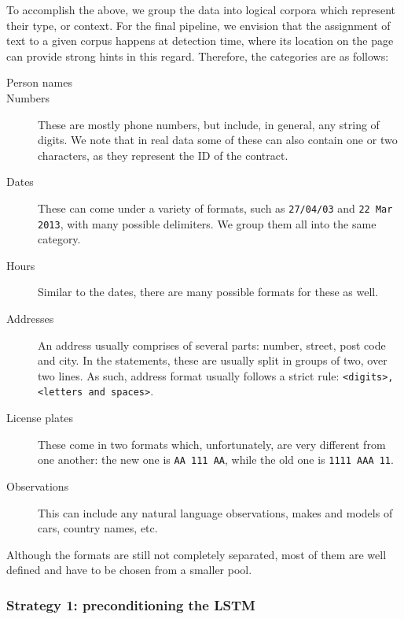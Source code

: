 			To accomplish the above, we group the data into logical corpora which represent their type, or context. For the final pipeline, we envision that the assignment of text to a given corpus happens at detection time, where its location on the page can provide strong hints in this regard. Therefore, the categories are as follows:
			\begin{description}
				\item[Person names\vspace{-1.5em}]

				\item[Numbers] These are mostly phone numbers, but include, in general, any string of digits. We note that in real data some of these can also contain one or two characters, as they represent the ID of the contract.

				\item[Dates] These can come under a variety of formats, such as \texttt{27/04/03} and \texttt{22 Mar 2013}, with many possible delimiters. We group them all into the same category.

				\item[Hours] Similar to the dates, there are many possible formats for these as well.

				\item[Addresses] An address usually comprises of several parts: number, street, post code and city. In the statements, these are usually split in groups of two, over two lines. As such, address format usually follows a strict rule: \texttt{<digits>, <letters and spaces>}.

				\item[License plates] These come in two formats which, unfortunately, are very different from one another: the new one is \texttt{AA 111 AA}, while the old one is \texttt{1111 AAA 11}.

				\item[Observations] This can include any natural language observations, makes and models of cars, country names, etc.
			\end{description}
			Although the formats are still not completely separated, most of them are well defined and have to be chosen from a smaller pool.

		\subsubsection*{Strategy 1: preconditioning the LSTM}


